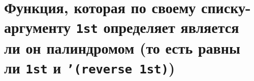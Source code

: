 
\section{Функция, которая по своему списку-аргументу \texttt{1st} определяет является ли он палиндромом (то есть равны ли \texttt{1st} и \texttt{'(reverse 1st)})}